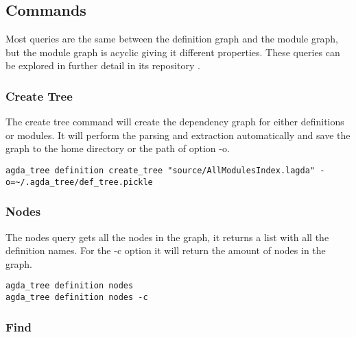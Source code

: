 
\subsection{Commands}

Most queries are the same between the definition graph and the module graph,
but the module graph is acyclic giving it different properties. These queries
can be explored in further detail in its repository \cite{agda_html}.


\subsubsection{Create Tree}

The create tree command will create the dependency graph for either definitions
or modules. It will perform the parsing and extraction automatically and save
the graph to the home directory or the path of option -o.

\begin{lstlisting}
agda_tree definition create_tree "source/AllModulesIndex.lagda" -o=~/.agda_tree/def_tree.pickle
\end{lstlisting}

\subsubsection{Nodes}

The nodes query gets all the nodes in the graph, it returns a list with all the
definition names. For the \textsf{-c} option it will return the amount of nodes
in the graph. 

\begin{lstlisting}
agda_tree definition nodes
agda_tree definition nodes -c
\end{lstlisting}

\subsubsection{Find}

